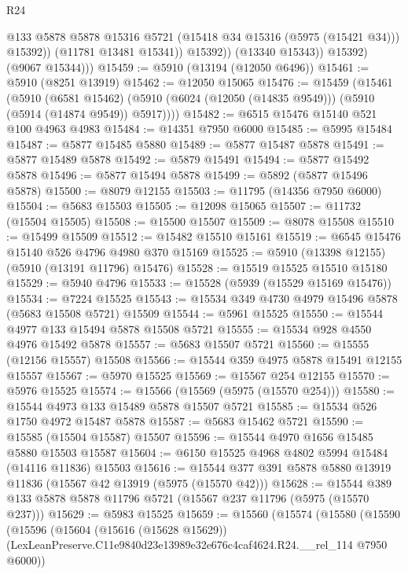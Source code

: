 \begin{lexlean}{R24}
\begin{coremodule}
                      @133
                      @5878
                      @5878
                      @15316
                      @5721
                      (@15418 @34 @15316 (@5975 (@15421 @34)))
                      @15392))
                  (@11781 @13481 @15341))
                @15392))
            (@13340 @15343))
          @15392)
        (@9067 @15344)))
@15459 := @5910 (@13194 (@12050 @6496))
@15461 := @5910 (@8251 @13919)
@15462 := @12050 @15065
@15476 := @15459
    (@15461
      (@5910
        (@6581 @15462)
        (@5910 (@6024 (@12050 (@14835 @9549))) (@5910 (@5914 (@14874 @9549)) @5917))))
@15482 := @6515 @15476 @15140 @521 @100 @4963 @4983
@15484 := @14351 @7950 @6000
@15485 := @5995 @15484
@15487 := @5877 @15485 @5880
@15489 := @5877 @15487 @5878
@15491 := @5877 @15489 @5878
@15492 := @5879 @15491
@15494 := @5877 @15492 @5878
@15496 := @5877 @15494 @5878
@15499 := @5892 (@5877 @15496 @5878)
@15500 := @8079 @12155
@15503 := @11795 (@14356 @7950 @6000)
@15504 := @5683 @15503
@15505 := @12098 @15065
@15507 := @11732 (@15504 @15505)
@15508 := @15500 @15507
@15509 := @8078 @15508
@15510 := @15499 @15509
@15512 := @15482 @15510 @15161
@15519 := @6545 @15476 @15140 @526 @4796 @4980 @370 @15169
@15525 := @5910 (@13398 @12155) (@5910 (@13191 @11796) @15476)
@15528 := @15519 @15525 @15510 @15180
@15529 := @5940 @4796
@15533 := @15528 (@5939 (@15529 @15169 @15476))
@15534 := @7224 @15525
@15543 := @15534 @349 @4730 @4979 @15496 @5878 (@5683 @15508 @5721) @15509
@15544 := @5961 @15525
@15550 := @15544 @4977 @133 @15494 @5878 @15508 @5721
@15555 := @15534 @928 @4550 @4976 @15492 @5878
@15557 := @5683 @15507 @5721
@15560 := @15555 (@12156 @15557) @15508
@15566 := @15544 @359 @4975 @5878 @15491 @12155 @15557
@15567 := @5970 @15525
@15569 := @15567 @254 @12155
@15570 := @5976 @15525
@15574 := @15566 (@15569 (@5975 (@15570 @254)))
@15580 := @15544 @4973 @133 @15489 @5878 @15507 @5721
@15585 := @15534 @526 @1750 @4972 @15487 @5878
@15587 := @5683 @15462 @5721
@15590 := @15585 (@15504 @15587) @15507
@15596 := @15544 @4970 @1656 @15485 @5880 @15503 @15587
@15604 := @6150 @15525 @4968 @4802 @5994 @15484 (@14116 @11836) @15503
@15616 := @15544 @377 @391 @5878 @5880 @13919 @11836 (@15567 @42 @13919 (@5975 (@15570 @42)))
@15628 := @15544 @389 @133 @5878 @5878 @11796 @5721 (@15567 @237 @11796 (@5975 (@15570 @237)))
@15629 := @5983 @15525
@15659 := @15560
    (@15574
      (@15580
        (@15590
          (@15596
            (@15604
              (@15616 (@15628 @15629))
              (LexLeanPreserve.C11e9840d23e13989e32e676c4caf4624.R24.__rel_114 @7950 @6000))

\end{coremodule}
\end{lexlean}
